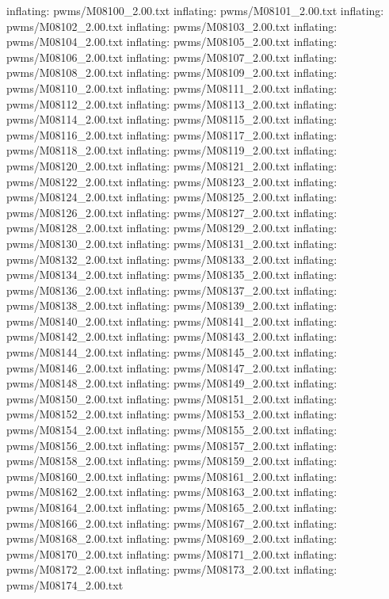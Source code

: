 \documentclass[letterpaper,10pt,english]{sphinxmanual}
\begin{document}
{\begin{sphinxVerbatim}[commandchars=\\\{\}]
  inflating: pwms/M08100\_2.00.txt
  inflating: pwms/M08101\_2.00.txt
  inflating: pwms/M08102\_2.00.txt
  inflating: pwms/M08103\_2.00.txt
  inflating: pwms/M08104\_2.00.txt
  inflating: pwms/M08105\_2.00.txt
  inflating: pwms/M08106\_2.00.txt
  inflating: pwms/M08107\_2.00.txt
  inflating: pwms/M08108\_2.00.txt
  inflating: pwms/M08109\_2.00.txt
  inflating: pwms/M08110\_2.00.txt
  inflating: pwms/M08111\_2.00.txt
  inflating: pwms/M08112\_2.00.txt
  inflating: pwms/M08113\_2.00.txt
  inflating: pwms/M08114\_2.00.txt
  inflating: pwms/M08115\_2.00.txt
  inflating: pwms/M08116\_2.00.txt
  inflating: pwms/M08117\_2.00.txt
  inflating: pwms/M08118\_2.00.txt
  inflating: pwms/M08119\_2.00.txt
  inflating: pwms/M08120\_2.00.txt
  inflating: pwms/M08121\_2.00.txt
  inflating: pwms/M08122\_2.00.txt
  inflating: pwms/M08123\_2.00.txt
  inflating: pwms/M08124\_2.00.txt
  inflating: pwms/M08125\_2.00.txt
  inflating: pwms/M08126\_2.00.txt
  inflating: pwms/M08127\_2.00.txt
  inflating: pwms/M08128\_2.00.txt
  inflating: pwms/M08129\_2.00.txt
  inflating: pwms/M08130\_2.00.txt
  inflating: pwms/M08131\_2.00.txt
  inflating: pwms/M08132\_2.00.txt
  inflating: pwms/M08133\_2.00.txt
  inflating: pwms/M08134\_2.00.txt
  inflating: pwms/M08135\_2.00.txt
  inflating: pwms/M08136\_2.00.txt
  inflating: pwms/M08137\_2.00.txt
  inflating: pwms/M08138\_2.00.txt
  inflating: pwms/M08139\_2.00.txt
  inflating: pwms/M08140\_2.00.txt
  inflating: pwms/M08141\_2.00.txt
  inflating: pwms/M08142\_2.00.txt
  inflating: pwms/M08143\_2.00.txt
  inflating: pwms/M08144\_2.00.txt
  inflating: pwms/M08145\_2.00.txt
  inflating: pwms/M08146\_2.00.txt
  inflating: pwms/M08147\_2.00.txt
  inflating: pwms/M08148\_2.00.txt
  inflating: pwms/M08149\_2.00.txt
  inflating: pwms/M08150\_2.00.txt
  inflating: pwms/M08151\_2.00.txt
  inflating: pwms/M08152\_2.00.txt
  inflating: pwms/M08153\_2.00.txt
  inflating: pwms/M08154\_2.00.txt
  inflating: pwms/M08155\_2.00.txt
  inflating: pwms/M08156\_2.00.txt
  inflating: pwms/M08157\_2.00.txt
  inflating: pwms/M08158\_2.00.txt
  inflating: pwms/M08159\_2.00.txt
  inflating: pwms/M08160\_2.00.txt
  inflating: pwms/M08161\_2.00.txt
  inflating: pwms/M08162\_2.00.txt
  inflating: pwms/M08163\_2.00.txt
  inflating: pwms/M08164\_2.00.txt
  inflating: pwms/M08165\_2.00.txt
  inflating: pwms/M08166\_2.00.txt
  inflating: pwms/M08167\_2.00.txt
  inflating: pwms/M08168\_2.00.txt
  inflating: pwms/M08169\_2.00.txt
  inflating: pwms/M08170\_2.00.txt
  inflating: pwms/M08171\_2.00.txt
  inflating: pwms/M08172\_2.00.txt
  inflating: pwms/M08173\_2.00.txt
  inflating: pwms/M08174\_2.00.txt

\end{sphinxVerbatim}}
\end{document}
